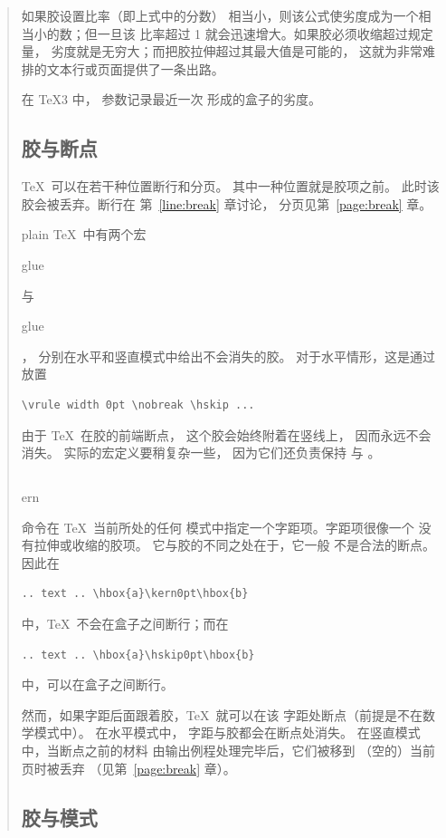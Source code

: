 \documentclass[a4paper]{rapport3}
\makeatletter
\newenvironment{disp}{\begin{quotation}}{\end{quotation}}
\def\cstoidx#1\par{\index{#1@\cs{#1}}}
\def\csidx#1{\cstoidx #1\par\cs{#1}}
\makeatother
\begin{document}
\begin{disp}
如果胶设置比率（即上式中的分数）
相当小，则该公式使劣度成为一个相当小的数；但一旦该
比率超过 1 就会迅速增大。如果胶必须收缩超过规定量，
劣度就是无穷大；而把胶拉伸超过其最大值是可能的，
这就为非常难排的文本行或页面提供了一条出路。

在 \TeX3 中， 参数记录最近一次
形成的盒子的劣度。

\subsection{胶与断点}

\TeX\ 可以在若干种位置断行和分页。
其中一种位置就是胶项之前。
此时该胶会被丢弃。断行在
第~\ref{line:break} 章讨论，
分页见第~\ref{page:break} 章。

plain \TeX\ 中有两个宏 \csidx{hglue} 与 \csidx{vglue}，
分别在水平和竖直模式中给出不会消失的胶。
对于水平情形，这是通过
放置
\begin{verbatim}
\vrule width 0pt \nobreak \hskip ...
\end{verbatim}
由于 \TeX\ 在胶的前端断点，
这个胶会始终附着在竖线上，
因而永远不会消失。
实际的宏定义要稍复杂一些，
因为它们还负责保持  与
。

\subsection{}

\csidx{kern} 命令在 \TeX\ 当前所处的任何
模式中指定一个字距项。字距项很像一个
没有拉伸或收缩的胶项。
它与胶的不同之处在于，它一般
不是合法的断点。因此在
\begin{verbatim}
.. text .. \hbox{a}\kern0pt\hbox{b}
\end{verbatim}
中，\TeX\ 不会在盒子之间断行；而在
\begin{verbatim}
.. text .. \hbox{a}\hskip0pt\hbox{b}
\end{verbatim}
中，可以在盒子之间断行。

然而，如果字距后面跟着胶，\TeX\ 就可以在该
字距处断点（前提是不在数学模式中）。
在水平模式中，
字距与胶都会在断点处消失。
在竖直模式中，当断点之前的材料
由输出例程处理完毕后，它们被移到
（空的）当前页时被丢弃
（见第~\ref{page:break} 章）。

\subsection{胶与模式}


\end{disp}
\end{document}
